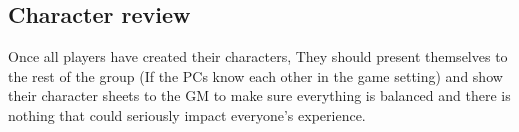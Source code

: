 \subsection{Character review}

Once all players have created their characters, They should present themselves to the rest of the group (If the PCs know each other in the game setting) and show their character sheets to the GM to make sure everything is balanced and there is nothing that could seriously impact everyone's experience.